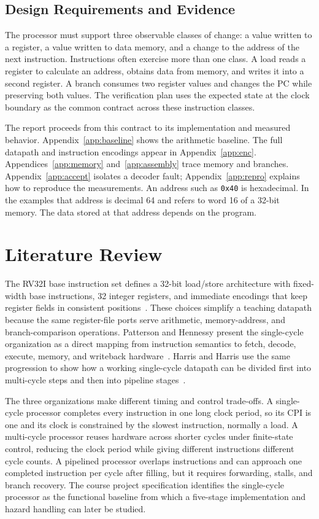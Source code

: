 \documentclass[conference,letterpaper]{IEEEtran}
\begin{document}
\subsection{Design Requirements and Evidence}
The processor must support three observable classes of change: a value written to a register, a value written to data memory, and a change to the address of the next instruction. Instructions often exercise more than one class. A load reads a register to calculate an address, obtains data from memory, and writes it into a second register. A branch consumes two register values and changes the PC while preserving both values. The verification plan uses the expected state at the clock boundary as the common contract across these instruction classes.

The report proceeds from this contract to its implementation and measured behavior. Appendix~\ref{app:baseline} shows the arithmetic baseline. The full datapath and instruction encodings appear in Appendix~\ref{app:enc}. Appendices~\ref{app:memory} and~\ref{app:assembly} trace memory and branches. Appendix~\ref{app:accept} isolates a decoder fault; Appendix~\ref{app:repro} explains how to reproduce the measurements. An address such as \texttt{0x40} is hexadecimal. In the examples that address is decimal 64 and refers to word 16 of a 32-bit memory. The data stored at that address depends on the program.

\section{Literature Review}
The RV32I base instruction set defines a 32-bit load/store architecture with fixed-width base instructions, 32 integer registers, and immediate encodings that keep register fields in consistent positions~\cite{isa}. These choices simplify a teaching datapath because the same register-file ports serve arithmetic, memory-address, and branch-comparison operations. Patterson and Hennessy present the single-cycle organization as a direct mapping from instruction semantics to fetch, decode, execute, memory, and writeback hardware~\cite{cod}. Harris and Harris use the same progression to show how a working single-cycle datapath can be divided first into multi-cycle steps and then into pipeline stages~\cite{harris}.

The three organizations make different timing and control trade-offs. A single-cycle processor completes every instruction in one long clock period, so its CPI is one and its clock is constrained by the slowest instruction, normally a load. A multi-cycle processor reuses hardware across shorter cycles under finite-state control, reducing the clock period while giving different instructions different cycle counts. A pipelined processor overlaps instructions and can approach one completed instruction per cycle after filling, but it requires forwarding, stalls, and branch recovery. The course project specification identifies the single-cycle processor as the functional baseline from which a five-stage implementation and hazard handling can later be studied.
\end{document}
